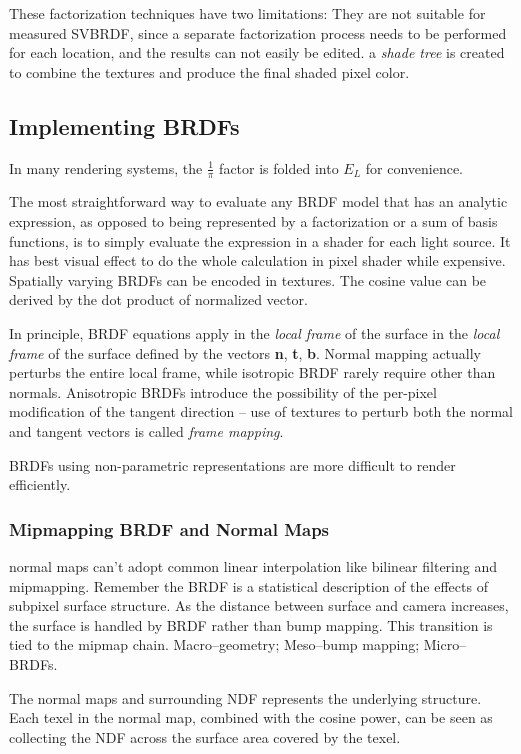 \documentclass[10pt, a4paper]{article}
\begin{document}
            These factorization techniques have two limitations: They are not suitable for measured SVBRDF, since a separate factorization process needs to be performed for each location, and the results can not easily be edited. a \emph{shade tree} is created to combine the textures and produce the final shaded pixel color. 
        
        \subsection{Implementing BRDFs}
            In many rendering systems, the $\frac{1}{\pi}$ factor is folded into $E_L$ for convenience. 
            
            The most straightforward way to evaluate any BRDF model that has an analytic expression, as opposed to being represented by a factorization or a sum of basis functions, is to simply evaluate the expression in a shader for each light source. It has best visual effect to do the whole calculation in pixel shader while expensive. Spatially varying BRDFs can be encoded in textures. The cosine value can be derived by the dot product of normalized vector. 

            In principle, BRDF equations apply in the \emph{local frame} of the surface in the \emph{local frame} of the surface defined by the vectors \textbf{n}, \textbf{t}, \textbf{b}. Normal mapping actually perturbs the entire local frame, while isotropic BRDF rarely require other than normals. Anisotropic BRDFs introduce the possibility of the per-pixel modification of the tangent direction -- use of textures to perturb both the normal and tangent vectors is called \emph{frame mapping}.

            BRDFs using non-parametric representations are more difficult to render efficiently. 

        \subsubsection{Mipmapping BRDF and Normal Maps}
            normal maps can't adopt common linear interpolation like bilinear filtering and mipmapping. Remember the BRDF is a statistical description of the effects of subpixel surface structure. As the distance between surface and camera increases, the surface is handled by BRDF rather than bump mapping. This transition is tied to the mipmap chain. Macro--geometry; Meso--bump mapping; Micro--BRDFs. 

            The normal maps and surrounding NDF represents the underlying structure. Each texel in the normal map, combined with the cosine power, can be seen as collecting the NDF across the surface area covered by the texel. 
\end{document}
